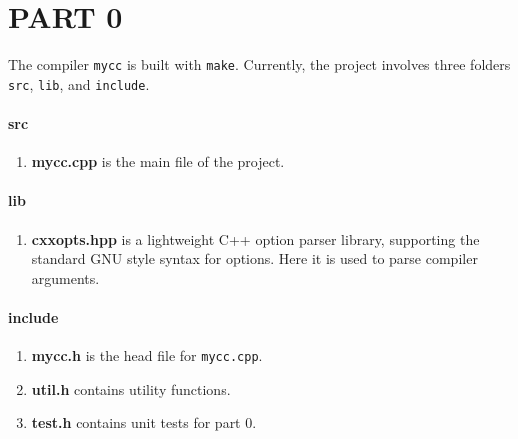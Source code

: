\section*{PART 0}

The compiler \texttt{mycc} is built with \texttt{make}.
Currently, the project involves three folders 
\texttt{src}, \texttt{lib}, and \texttt{include}.

\paragraph{\large\textbf{src}} 
\begin{enumerate}
    \item \textbf{mycc.cpp} is the main file of the project.
\end{enumerate}

\paragraph{\large\textbf{lib}} 
\begin{enumerate}
    \item \textbf{cxxopts.hpp} is a lightweight C++ option parser library, supporting the standard GNU style syntax for options. Here it is used to parse compiler arguments.
\end{enumerate}

\paragraph{\large\textbf{include}} 
\begin{enumerate}
    \item \textbf{mycc.h} is the head file for \texttt{mycc.cpp}.
    \item \textbf{util.h} contains utility functions.
    \item \textbf{test.h} contains unit tests for part 0.
\end{enumerate}